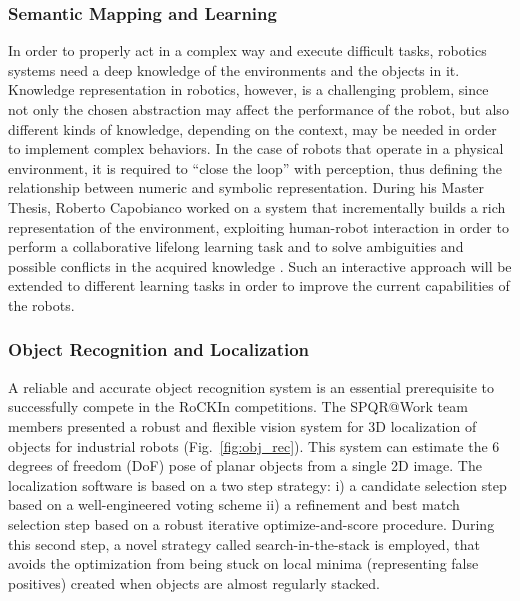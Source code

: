 \documentclass[conference]{IEEEtran}
\begin{document}
\subsubsection{Semantic Mapping and Learning}\label{sec:semantic_map}
In order to properly act in a complex way and execute difficult tasks, robotics systems need a deep knowledge of the environments and the objects in it. Knowledge representation in robotics, however, is a challenging problem, since not only the chosen abstraction may affect the performance of the robot, but also different kinds of knowledge, depending on the context, may be needed in order to implement complex behaviors. In the case of robots that operate in a physical environment, it is required to “close the loop” with perception, thus defining the relationship between numeric and symbolic representation. During his Master Thesis, Roberto Capobianco worked on a system that incrementally builds a rich representation of the environment, exploiting human-robot interaction in order to perform a collaborative lifelong learning task and to solve ambiguities and possible conflicts in the acquired knowledge \cite{bastianelli2013line}\cite{bastianelliBCGIN13}. Such an interactive approach will be extended to different learning tasks in order to improve the current capabilities of the robots.

\subsubsection{Object Recognition and Localization}\label{sec:object_rec}
A reliable and accurate object recognition system is an essential prerequisite to successfully compete in the RoCKIn competitions. The SPQR@Work team members presented a robust and flexible vision system for 3D localization of objects for industrial robots \cite{prettoCASE2013} (Fig.~\ref{fig:obj_rec}). This system can estimate the 6 degrees of freedom (DoF) pose of planar objects from a single 2D image.
The localization software is based on a two step strategy: i) a candidate selection step based on a well-engineered voting scheme ii) a refinement and best match selection step based on a robust iterative optimize-and-score procedure. During this second step, a novel strategy called search-in-the-stack is employed, that avoids the optimization from being stuck on local minima (representing false positives) created when objects are almost regularly stacked.
\end{document}

